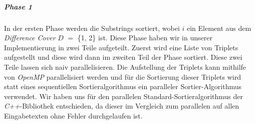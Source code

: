 \subparagraph*{Phase 1}

In der ersten Phase werden die Substrings  sortiert, wobei $i$ ein Element aus dem \emph{Difference Cover} \(D\) $=$ \{1, 2\} ist. Diese Phase haben wir in unserer Implementierung in zwei Teile aufgeteilt. Zuerst wird eine Liste von Triplets aufgestellt und diese wird dann im zweiten Teil der Phase sortiert.
Diese zwei Teile lassen sich naiv parallelisieren. Die Aufstellung der Triplets kann mithilfe von \emph{OpenMP} parallelisiert werden und für die Sortierung dieser Triplets wird statt eines sequentiellen Sortieralgorithmus ein paralleler Sortier-Algorithmus verwendet. Wir haben uns für den parallelen Standard-Sortieralgorithmus der \emph{C++}-Bibliothek entschieden, da dieser im Vergleich zum parallelen \ipsviero auf allen Eingabetexten ohne Fehler durchgelaufen ist.
